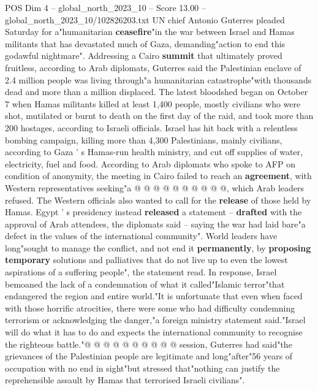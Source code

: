 \begin{textsample}{POS Dim 4 – global\_north\_2023\_10 – Score 13.00 – global\_north\_2023\_10/102826203.txt}  \label{ex:f4_pos_443}
UN chief Antonio Guterres pleaded Saturday for a"humanitarian \textbf{ceasefire}"in the war between Israel and Hamas militants that has devastated much of Gaza, demanding"action to end this godawful nightmare".
Addressing a Cairo \textbf{summit} that ultimately proved fruitless, according to Arab diplomats, Guterres said the Palestinian enclave of 2.4 million people was living through"a humanitarian catastrophe"with thousands dead and more than a million displaced.
The latest bloodshed began on October 7 when Hamas militants killed at least 1,400 people, mostly civilians who were shot, mutilated or burnt to death on the first day of the raid, and took more than 200 hostages, according to Israeli officials.
Israel has hit back with a relentless bombing campaign, killing more than 4,300 Palestinians, mainly civilians, according to Gaza ' s Hamas-run health ministry, and cut off supplies of water, electricity, fuel and food.
According to Arab diplomats who spoke to AFP on condition of anonymity, the meeting in Cairo failed to reach an \textbf{agreement}, with Western representatives seeking"a @ @ @ @ @ @ @ @ @ @, which Arab leaders refused.
The Western officials also wanted to call for the \textbf{release} of those held by Hamas.
Egypt ' s presidency instead \textbf{released} a statement -- \textbf{drafted} with the approval of Arab attendees, the diplomats said -- saying the war had laid bare"a defect in the values of the international community".
World leaders have long"sought to manage the conflict, and not end it \textbf{permanently}, by \textbf{proposing} \textbf{temporary} solutions and palliatives that do not live up to even the lowest aspirations of a suffering people", the statement read.
In response, Israel bemoaned the lack of a condemnation of what it called"Islamic terror"that endangered the region and entire world."It is unfortunate that even when faced with those horrific atrocities, there were some who had difficulty condemning terrorism or acknowledging the danger,"a foreign ministry statement said."Israel will do what it has to do and expects the international community to recognise the righteous battle."@ @ @ @ @ @ @ @ @ @ session, Guterres had said"the grievances of the Palestinian people are legitimate and long"after"56 years of occupation with no end in sight"but stressed that"nothing can justify the reprehensible assault by Hamas that terrorised Israeli civilians".

\end{textsample}
